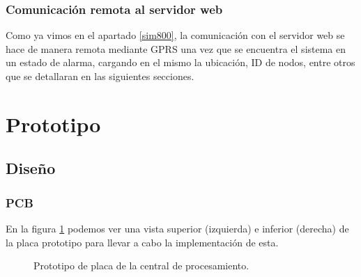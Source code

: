 \subsubsection{Comunicación remota al servidor web}
\par Como ya vimos en el apartado \ref{sim800}, la comunicación con el servidor web se hace de 
manera remota mediante GPRS una vez que se encuentra el sistema en un estado de alarma, cargando 
en el mismo la ubicación, ID de nodos, entre otros que se detallaran en las siguientes secciones. 

\section{Prototipo}
\subsection{Diseño}
\subsubsection{PCB}
\par En la figura \ref{im:pcb-prototipo} podemos ver una vista superior (izquierda) e inferior 
(derecha) de la placa prototipo para llevar a cabo la implementación de esta. 
\begin{figure}[h!]
\begin{center}
    \caption{Prototipo de placa de la central de procesamiento.}
	\label{im:pcb-prototipo}
\end{center}
\end{figure}


